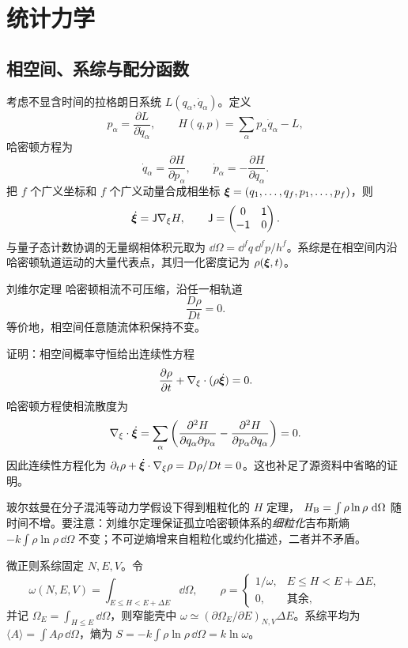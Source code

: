 
\section{统计力学}

\subsection{相空间、系综与配分函数}

考虑不显含时间的拉格朗日系统 $L(q_\alpha,\dot q_\alpha)$。定义
\[
 p_\alpha=\frac{\partial L}{\partial\dot q_\alpha},
 \qquad
 H(q,p)=\sum_\alpha p_\alpha\dot q_\alpha-L,
\]
哈密顿方程为
\[
 \dot q_\alpha=\frac{\partial H}{\partial p_\alpha},
 \qquad
 \dot p_\alpha=-\frac{\partial H}{\partial q_\alpha}.
\]
把 $f$ 个广义坐标和 $f$ 个广义动量合成相坐标
$\bm{\xi}=(q_1,\ldots,q_f,p_1,\ldots,p_f)$，则
\[
 \dot{\bm{\xi}}=\mathsf J\nabla_\xi H,
 \qquad
 \mathsf J=\begin{pmatrix}0&\mathsf1\\-\mathsf1&0\end{pmatrix}.
\]
与量子态计数协调的无量纲相体积元取为
$\dd\Omega=\dd^f q\,\dd^f p/h^f$。系综是在相空间内沿哈密顿轨道运动的大量代表点，其归一化密度记为 $\rho(\bm{\xi},t)$。

\begin{advtheorem}{刘维尔定理}\label{advA2:thm:liouville}
哈密顿相流不可压缩，沿任一相轨道
\[
 \boxed{\frac{D\rho}{Dt}=0}.
\]
等价地，相空间任意随流体积保持不变。
\end{advtheorem}
证明：相空间概率守恒给出连续性方程
\[
 \frac{\partial\rho}{\partial t}
 +\nabla_\xi\cdot(\rho\dot{\bm{\xi}})=0.
\]
哈密顿方程使相流散度为
\[
 \nabla_\xi\cdot\dot{\bm{\xi}}
 =\sum_\alpha\left(
 \frac{\partial^2H}{\partial q_\alpha\partial p_\alpha}
 -\frac{\partial^2H}{\partial p_\alpha\partial q_\alpha}
 \right)=0.
\]
因此连续性方程化为
$\partial_t\rho+\dot{\bm{\xi}}\cdot\nabla_\xi\rho=D\rho/Dt=0$。这也补足了源资料中省略的证明。

玻尔兹曼在分子混沌等动力学假设下得到粗粒化的 $H$ 定理，
$H_{\rm B}=\int\rho\ln\rho\,\mathop{}\!\mathrm d\Omega$ 随时间不增。要注意：刘维尔定理保证孤立哈密顿体系的\emph{细粒化}吉布斯熵
$-k\int\rho\ln\rho\,\dd\Omega$ 不变；不可逆熵增来自粗粒化或约化描述，二者并不矛盾。

微正则系综固定 $N,E,V$。令
\[
 \omega(N,E,V)=\int_{E\le H<E+\Delta E}\dd\Omega,
 \qquad
 \rho=\begin{cases}1/\omega,&E\le H<E+\Delta E,\\0,&\text{其余},\end{cases}
\]
并记 $\Omega_E=\int_{H\le E}\dd\Omega$，则窄能壳中
$\omega\simeq(\partial\Omega_E/\partial E)_{N,V}\Delta E$。系综平均为
$\langle A\rangle=\int A\rho\,\dd\Omega$，熵为
$S=-k\int\rho\ln\rho\,\dd\Omega=k\ln\omega$。

